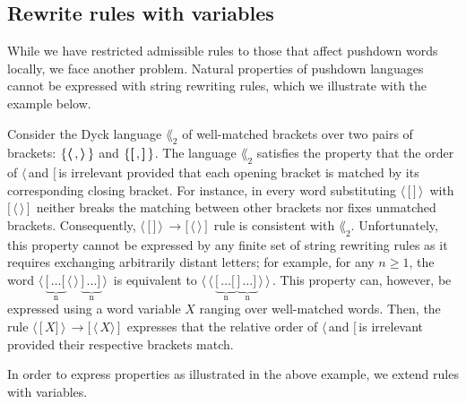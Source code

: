 \subsection{Rewrite rules with variables}
While we have restricted admissible rules to those that affect pushdown words locally, we face another problem. 
Natural properties of pushdown languages cannot be expressed with string rewriting rules, 
which we illustrate with the example below.

\begin{example}
\newcommand{\OpenDelOne}{\ensuremath{\boldsymbol{\langle}}\,}
\newcommand{\CloseDelOne}{\ensuremath{\boldsymbol{\rangle}}\,}
\newcommand{\OpenDelTwo}{\ensuremath{\boldsymbol{[}}\,}
\newcommand{\CloseDelTwo}{\ensuremath{\boldsymbol{]}}\,}
Consider the Dyck language $\lang_2$ of well-matched brackets over two pairs of brackets: \( \set{ \OpenDelOne, \CloseDelOne} \) and \( \set{\OpenDelTwo, \CloseDelTwo} \). 
The language $\lang_2$ satisfies the property that the order of \OpenDelOne and \OpenDelTwo is irrelevant provided that 
each opening bracket is matched by its corresponding closing bracket. 
For instance, in every word substituting $\OpenDelOne \OpenDelTwo \CloseDelTwo \CloseDelOne$ with 
 $\OpenDelTwo  \OpenDelOne \CloseDelOne \CloseDelTwo$ neither breaks the matching between other brackets nor fixes unmatched brackets.
Consequently,
  $\OpenDelOne \OpenDelTwo \CloseDelTwo \CloseDelOne \to \OpenDelTwo  \OpenDelOne \CloseDelOne \CloseDelTwo$ rule is consistent with
  $\lang_2$. 
Unfortunately, this property cannot be expressed by any finite set of string rewriting rules as it requires  exchanging arbitrarily distant letters; for example, for any $n \geq 1$, the word 
\(  \OpenDelOne \underbrace{\OpenDelTwo \ldots \OpenDelTwo}_\text{n} \OpenDelOne \CloseDelOne \underbrace{\CloseDelTwo \ldots \CloseDelTwo}_\text{n} \CloseDelOne \) 
is equivalent to 
\(  \OpenDelOne \OpenDelOne \underbrace{\OpenDelTwo \ldots \OpenDelTwo}_\text{n} \underbrace{\CloseDelTwo \ldots \CloseDelTwo}_\text{n} \CloseDelOne \CloseDelOne. \) 
This property can, however, be expressed using a word variable $X$ ranging over well-matched words.
Then, the rule \(  \OpenDelOne \OpenDelTwo X \CloseDelTwo \CloseDelOne \to  \OpenDelTwo  \OpenDelOne X \CloseDelOne \CloseDelTwo \)
expresses that the relative order of \OpenDelOne and \OpenDelTwo is irrelevant provided their respective brackets match.
\end{example}

In order to express properties as illustrated in the above example, we extend rules with variables. 

